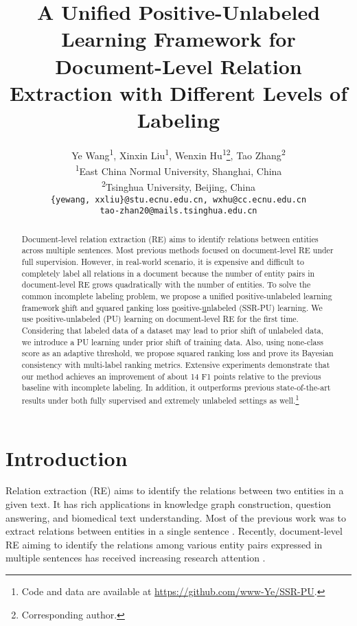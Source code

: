 \documentclass[11pt]{article}
\title{A Unified Positive-Unlabeled Learning Framework for Document-Level Relation Extraction with Different Levels of Labeling}
\author{Ye Wang\textsuperscript{1}, Xinxin Liu\textsuperscript{1}, Wenxin Hu\textsuperscript{1}\thanks{\enspace Corresponding author.}, Tao Zhang\textsuperscript{2} \\
  \textsuperscript{1}East China Normal University, Shanghai, China\\
  \textsuperscript{2}Tsinghua University, Beijing, China\\
  \texttt{\{yewang, xxliu\}@stu.ecnu.edu.cn, wxhu@cc.ecnu.edu.cn}\\
  \texttt{tao-zhan20@mails.tsinghua.edu.cn}}
\begin{document}
\maketitle
\begin{abstract}
Document-level relation extraction (RE) aims to identify relations between entities across multiple sentences. Most previous methods focused on document-level RE under full supervision. However, in real-world scenario, it is expensive and difficult to completely label all relations in a document because the number of entity pairs in document-level RE grows quadratically with the number of entities. \enspace To solve the common incomplete labeling problem, we propose a unified positive-unlabeled learning framework  \underline{s}hift and \underline{s}quared \underline{r}anking loss \underline{p}ositive-\underline{u}nlabeled (SSR-PU) learning.
We use positive-unlabeled (PU) learning on document-level RE for the first time. Considering that labeled data of a dataset may lead to prior shift of unlabeled data, we introduce a PU learning under prior shift of training data. Also, using none-class score as an adaptive threshold, we propose squared ranking loss and prove its Bayesian consistency with multi-label ranking metrics. \enspace Extensive experiments demonstrate that our method achieves an improvement of about 14 F1 points relative to the previous baseline with incomplete labeling. In addition, it outperforms previous state-of-the-art results under both fully supervised and extremely unlabeled settings as well.\footnote{Code and data are available at \url{https://github.com/www-Ye/SSR-PU}.}
\end{abstract}

\section{Introduction}

Relation extraction (RE) aims to identify the relations between two entities in a given text. It has rich applications in knowledge graph construction, question answering, and biomedical text understanding. Most of the previous work was to extract relations between entities in a single sentence \citep{miwa-bansal-2016-end, zhang-etal-2018-graph}. Recently, document-level RE aiming to identify the relations \noindent among various entity pairs expressed in multiple sentences has received increasing research attention \citep{yao-etal-2019-docred, Zhou_Huang_Ma_Huang_2021,xu-etal-2022-document}.
\end{document}
